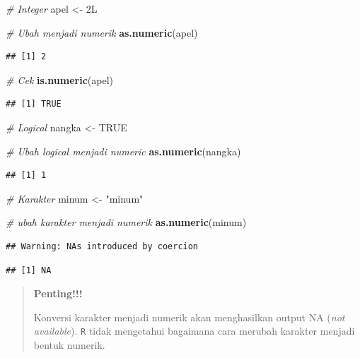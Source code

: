 \documentclass[]{book}
\newenvironment{Shaded}{\begin{snugshade}}{\end{snugshade}}
\newcommand{\CommentTok}[1]{\textcolor[rgb]{0.56,0.35,0.01}{\textit{#1}}}
\newcommand{\KeywordTok}[1]{\textcolor[rgb]{0.13,0.29,0.53}{\textbf{#1}}}
\newcommand{\NormalTok}[1]{#1}
\newcommand{\OtherTok}[1]{\textcolor[rgb]{0.56,0.35,0.01}{#1}}
\newcommand{\StringTok}[1]{\textcolor[rgb]{0.31,0.60,0.02}{#1}}
\theoremstyle{definition}
\theoremstyle{definition}
\theoremstyle{definition}
\theoremstyle{remark}
\begin{document}
\begin{Shaded}
\begin{Highlighting}[]
\CommentTok{# Integer}
\NormalTok{apel <-}\StringTok{ }\NormalTok{2L}

\CommentTok{# Ubah menjadi numerik}
\KeywordTok{as.numeric}\NormalTok{(apel)}
\end{Highlighting}
\end{Shaded}

\begin{verbatim}
## [1] 2
\end{verbatim}

\begin{Shaded}
\begin{Highlighting}[]
\CommentTok{# Cek}
\KeywordTok{is.numeric}\NormalTok{(apel)}
\end{Highlighting}
\end{Shaded}

\begin{verbatim}
## [1] TRUE
\end{verbatim}

\begin{Shaded}
\begin{Highlighting}[]
\CommentTok{# Logical}
\NormalTok{nangka <-}\StringTok{ }\OtherTok{TRUE}

\CommentTok{# Ubah logical menjadi numeric}
\KeywordTok{as.numeric}\NormalTok{(nangka)}
\end{Highlighting}
\end{Shaded}

\begin{verbatim}
## [1] 1
\end{verbatim}

\begin{Shaded}
\begin{Highlighting}[]
\CommentTok{# Karakter}
\NormalTok{minum <-}\StringTok{ "minum"}

\CommentTok{# ubah karakter menjadi numerik}
\KeywordTok{as.numeric}\NormalTok{(minum)}
\end{Highlighting}
\end{Shaded}

\begin{verbatim}
## Warning: NAs introduced by coercion
\end{verbatim}

\begin{verbatim}
## [1] NA
\end{verbatim}

\begin{quote}
\textbf{Penting!!!}

Konversi karakter menjadi numerik akan menghasilkan output NA (\emph{not available}). \texttt{R} tidak mengetahui bagaimana cara merubah karakter menjadi bentuk numerik.
\end{quote}
\end{document}
